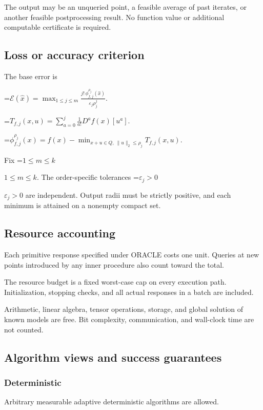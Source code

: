 \documentclass[10pt,a4paper]{article}
\newcommand{\AtlasMath}[1]{\par\begingroup\centering\setbox0=\hbox{$\displaystyle #1$}\ifdim\wd0>1.4\linewidth\typeout{ATLAS WIDE FORMULA: \the\wd0}\fi\ifdim\wd0>\linewidth\resizebox{\linewidth}{!}{\box0}\else\box0\fi\par\endgroup}
\newcommand{\AtlasInlineMath}[1]{\begingroup\setbox0=\hbox{$#1$}\ifdim\wd0>.4\linewidth\endgroup\AtlasMath{#1}\else\endgroup$#1$\fi}
\begin{document}
The output may be an unqueried point, a feasible average of past iterates, or another feasible postprocessing result. No function value or additional computable certificate is required.

\subsection{Loss or accuracy criterion}
The base error is


\AtlasMath{\mathcal{E}(\widehat{x})=\max_{1\le j\le m}\frac{j!\,\phi_{f,j}^{\rho_j}(\widehat{x})}{\varepsilon_j\rho_j^j}.}



\AtlasMath{T_{f,j}(x,u)=\sum_{a=0}^{j}\frac1{a!}D^af(x)[u^a].}



\AtlasMath{\phi_{f,j}^{\rho_j}(x)=f(x)-\min_{x+u\in Q,\ \|u\|_2\le\rho_j}T_{f,j}(x,u).}


Fix \AtlasInlineMath{1\le m\le k}. The order-specific tolerances \AtlasInlineMath{\varepsilon_j>0} are independent. Output radii must be strictly positive, and each minimum is attained on a nonempty compact set.

\subsection{Resource accounting}
Each primitive response specified under ORACLE costs one unit. Queries at new points introduced by any inner procedure also count toward the total.

The resource budget is a fixed worst-case cap on every execution path. Initialization, stopping checks, and all actual responses in a batch are included.

Arithmetic, linear algebra, tensor operations, storage, and global solution of known models are free. Bit complexity, communication, and wall-clock time are not counted.

\subsection{Algorithm views and success guarantees}
\subsubsection{Deterministic}
Arbitrary measurable adaptive deterministic algorithms are allowed.
\end{document}
